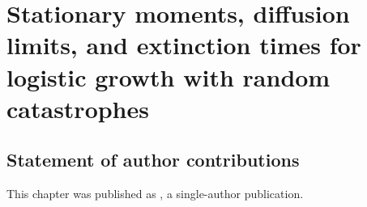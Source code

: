 



\def\reals{\mathbb{R}}
\def\be{\begin{equation}}
\def\ee{\end{equation}}
\def\bea{\begin{eqnarray}}
\def\eea{\end{eqnarray}}
\def\bml{\begin{mathletters}}
\def\eml{\end{mathletters}}
\def\bse{\begin{subequations}}
\def\ese{\end{subequations}}
\def\expec{\mathbb{E}}
\def\exp{\text{exp}}
\def\Var{\text{Var}}
\def\e{\text{e}}

\chapter{Stationary moments, diffusion limits, and extinction times for logistic growth with random catastrophes}
\label{ch:math}

\section{Statement of author contributions}
This chapter was published as \cite{schlomann2018stationary}, a single-author publication.

